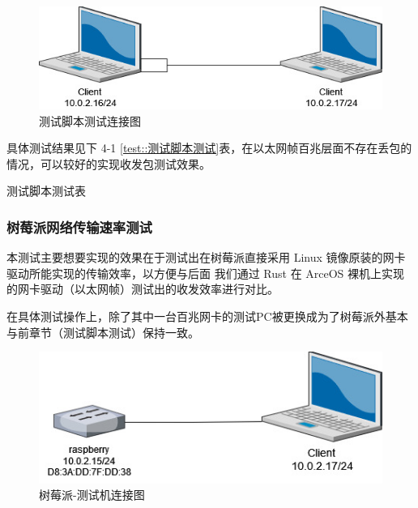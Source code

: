     \begin{figure}[ht]
        \centering
        \includegraphics[scale=0.6]{imgs/测试脚本测试连接图.jpg}
        \caption{测试脚本测试连接图}    \label{tests::测试脚本测试连接图}
    \end{figure}

    具体测试结果见下 4-1 \ref{test::测试脚本测试}表，在以太网帧百兆层面不存在丢包的情况，可以较好的实现收发包测试效果。

    \begin{table}[ht]
    \centering
    \label{tests::测试脚本测试}
    \caption{测试脚本测试表}
    \end{table}

    \subsubsection{树莓派网络传输速率测试}

    本测试主要想要实现的效果在于测试出在树莓派直接采用 Linux 镜像原装的网卡驱动所能实现的传输效率，以方便与后面
    我们通过 Rust 在 ArceOS 裸机上实现的网卡驱动（以太网帧）测试出的收发效率进行对比。

    在具体测试操作上，除了其中一台百兆网卡的测试PC被更换成为了树莓派外基本与前章节（测试脚本测试）保持一致。
    
    \begin{figure}[ht]
        \centering
        \includegraphics[scale=0.6]{imgs/树莓派-测试机连接.jpg}
        \caption{树莓派-测试机连接图}    \label{tests::树莓派测试机连接图}
    \end{figure}



